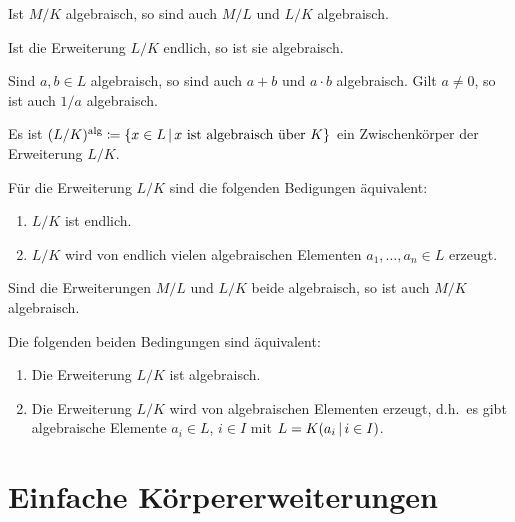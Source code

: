\begin{example}
  Ist $M/K$ algebraisch, so sind auch $M/L$ und $L/K$ algebraisch.
\end{example}

\begin{lemma}
  Ist die Erweiterung $L/K$ endlich, so ist sie algebraisch.
\end{lemma}

\begin{corollary}
  Sind $a, b \in L$ algebraisch, so sind auch $a + b$ und $a \cdot b$ algebraisch.
  Gilt $a \neq 0$, so ist auch $1/a$ algebraisch.
\end{corollary}

\begin{corollary}
  Es ist $(L/K)^\alg \defined \{ x \in L \suchthat \text{$x$ ist algebraisch über $K$} \}$ ein Zwischenkörper der Erweiterung $L/K$.
\end{corollary}

\begin{corollary}
  Für die Erweiterung $L/K$ sind die folgenden Bedigungen äquivalent:
  \begin{enumerate}
    \item
      $L/K$ ist endlich.
    \item
      $L/K$ wird von endlich vielen algebraischen Elementen $a_1, \dotsc, a_n \in L$ erzeugt.
  \end{enumerate}
\end{corollary}

\begin{corollary}
  Sind die Erweiterungen $M/L$ und $L/K$ beide algebraisch, so ist auch $M/K$ algebraisch.
\end{corollary}

\begin{corollary}
  Die folgenden beiden Bedingungen sind äquivalent:
  \begin{enumerate}
    \item
      Die Erweiterung $L/K$ ist algebraisch.
    \item
      Die Erweiterung $L/K$ wird von algebraischen Elementen erzeugt, d.h.\ es gibt algebraische Elemente $a_i \in L$, $i \in I$ mit $L = K(a_i \suchthat i \in I)$.
  \end{enumerate}
\end{corollary}






\section{Einfache Körpererweiterungen}

